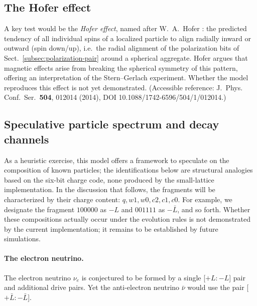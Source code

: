 \documentclass{ijuc}
\begin{document}
\subsection{The Hofer effect}\label{subsec:hofer}
A key test would be the \emph{Hofer effect}, named after W.~A.~Hofer \cite{hofer}: the predicted tendency of all individual spins of a localized particle to align radially inward or outward (spin down/up), i.e.\ the radial alignment of the polarization bits of Sect.~\ref{subsec:polarization-pair} around a spherical aggregate. Hofer argues that magnetic effects arise from breaking the spherical symmetry of this pattern, offering an interpretation of the Stern--Gerlach experiment. Whether the model reproduces this effect is not yet demonstrated.  (Accessible reference: J.~Phys. Conf.~Ser.~\textbf{504}, 012014 (2014), DOI 10.1088/1742-6596/504/1/012014.)
\subsection{Speculative particle spectrum and decay channels}
As a heuristic exercise, this model offers a framework to speculate on the composition of known particles; the identifications below are structural analogies based on the six-bit charge code, none produced by the small-lattice implementation.
In the discussion that follows, the fragments will be characterized by their charge content: \(q, w1, w0, c2, c1, c0\).
For example, we designate the fragment \(100000\) as \(-L\) and \(001111\) as \(-\bar{L}\), and so forth.
Whether these compositions actually occur under the evolution rules is not demonstrated by the current implementation; it remains to be established by future simulations.
\paragraph{The electron neutrino.}
The electron neutrino $\nu_e$ is conjectured to be formed by a single [$+L:-L$] pair and additional drive pairs.
Yet the anti-electron neutrino $\bar{\nu}$ would use the pair [$+\bar{L}:-\bar{L}$].
\end{document}
